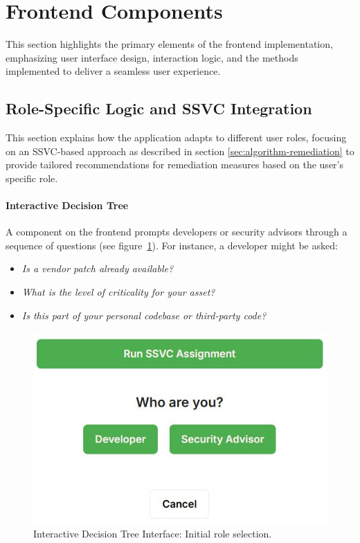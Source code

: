 \section{Frontend Components}
\label{sec:frontend-components}

This section highlights the primary elements of the frontend implementation, emphasizing user interface design, interaction logic, and the methods implemented to deliver a seamless user experience.

\subsection{Role-Specific Logic and SSVC Integration}
\label{subsec:ssvc-integration}
This section explains how the application adapts to different user roles, focusing on an \ac{SSVC}-based approach as described in section \ref{sec:algorithm-remediation} to provide tailored recommendations for remediation measures based on the user's specific role.

\paragraph{Interactive Decision Tree}
A component on the frontend prompts developers or security advisors through a sequence of questions (see figure~\ref{fig:ssvc-tree-interface}). For instance, a developer might be asked: 
\begin{itemize} 
    \item \textit{Is a vendor patch already available?} \item \textit{What is the level of criticality for your asset?} \item \textit{Is this part of your personal codebase or third-party code?} 
\end{itemize}

\begin{figure}[H]
    \centering
    \includegraphics[scale=0.6]{resources/SSVC_Input.png}
    \caption{Interactive Decision Tree Interface: Initial role selection.}
    \label{fig:ssvc-tree-interface}
\end{figure}

